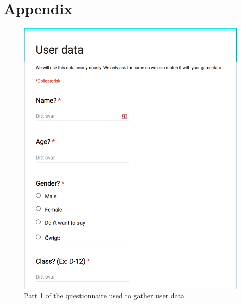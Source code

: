 \documentclass[a4paper,12pt]{kth-mag}
\begin{document}
\chapter{Appendix}\label{appA}
\begin{figure}[ht]
	\centering
	\includegraphics[keepaspectratio, scale = 0.68]{images/user_data_1.png}
	\caption{\small{Part 1 of the questionnaire used to gather user data}}\label{fig:ud_1}
\end{figure}
\end{document}
